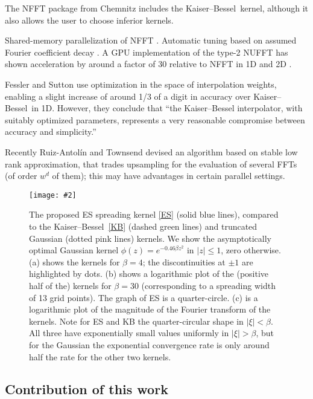 \documentclass[10pt]{article}
\newcommand{\bfi}{\begin{figure}}
\newcommand{\efi}{\end{figure}}
\newcommand{\ca}[2]{\caption{#1 \label{#2}}}
\newcommand{\ig}[2]{\texttt{[image: \#2]}}
\newcommand{\freq}{\beta}          %
\newcommand{\KB}{Kaiser--Bessel}
\begin{document}
The NFFT package \cite{nfft} from Chemnitz
includes the \KB\ kernel, although it also allows the user to
choose inferior kernels.

Shared-memory parallelization of NFFT \cite{volkmer}.
Automatic tuning based on assumed Fourier coefficient decay \cite{nestler}.
A GPU implementation of the type-2 NUFFT has shown acceleration by around
a factor of 30 relative to NFFT in 1D and 2D \cite{cunfft}.

Fessler and Sutton \cite{fessler} use optimization in the space of
interpolation weights, enabling a slight increase of around 1/3 of a
digit in accuracy over \KB\ in 1D. However, they conclude that
``the
Kaiser--Bessel interpolator, with suitably optimized parameters,
represents a very reasonable compromise between accuracy and
simplicity.''

Recently Ruiz-Antol\'in and Townsend
\cite{townsendnufft} devised an algorithm
based on stable low rank approximation, that
trades upsampling for the evaluation of several FFTs (of order $w^d$ of them);
this may have advantages in certain parallel settings.



\bfi[t]  %
\hspace{-2ex}\ig{width=6.7in}{kernel.eps}
\ca{The proposed ES spreading kernel
  \eqref{ES} (solid blue lines), compared to the \KB\ \eqref{KB}
  (dashed green lines) and truncated Gaussian (dotted pink lines) kernels.
  We show the asymptotically optimal
  Gaussian kernel $\phi(z) = e^{-0.46 \beta z^2}$ in $|z|\le 1$, zero otherwise.
  (a) shows the kernels for $\freq=4$; the discontinuities at
  $\pm 1$ are highlighted by dots.
  (b) shows a logarithmic plot of the (positive half of the)
  kernels for $\freq=30$
  (corresponding to a spreading width of 13 grid points).
  The graph of ES is a quarter-circle.
  (c) is a logarithmic plot of the magnitude of the
  Fourier transform of the kernels.
  Note for ES and KB the quarter-circular shape in $|\xi|<\freq$.
  All three have exponentially small values uniformly in $|\xi|>\freq$, but
  for the Gaussian the exponential convergence rate is only around half
  the rate for the other two kernels.
}{f:kernel}
\efi


\subsection{Contribution of this work}
\end{document}
